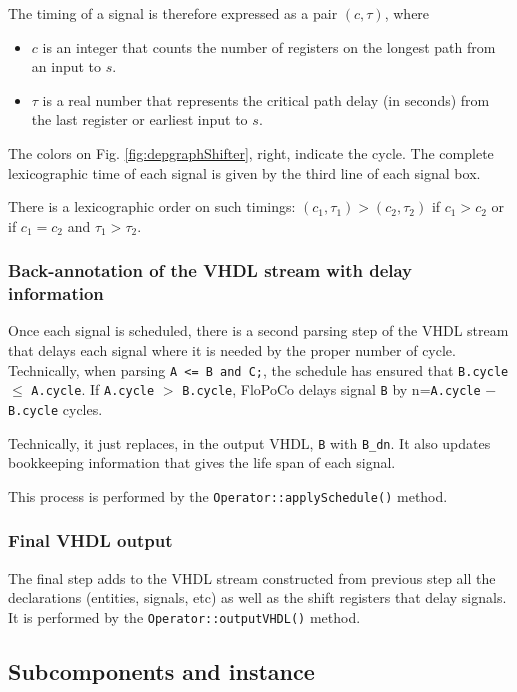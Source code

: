 \documentclass{article}
\begin{document}
The timing of a signal is therefore expressed as a pair $(c, \tau)$, where
\begin{itemize}
\item $c$ is an integer that counts the number of registers
  on the longest path from an input to $s$.
\item $\tau$ is a real number that represents the critical path delay (in seconds)
  from the last register or earliest input to $s$.
\end{itemize}

The colors on Fig. \ref{fig:depgraphShifter}, right,  indicate the cycle.
The complete lexicographic time of each signal is given by the third line of each signal box. 

There is a lexicographic order on such timings: $(c_1, \tau_1) > (c_2, \tau_2)$ if $c_1 > c_2$ or if $c_1 = c_2$ and $\tau_1 > \tau_2$.

\subsubsection{Back-annotation of the VHDL stream with delay information}
Once each signal is scheduled, there is a second parsing step of the VHDL stream that delays each signal where it is needed by the proper number of cycle.
Technically, when parsing
\verb!A <= B and C;!, the schedule has ensured that  \verb!B.cycle!$\le$ \verb!A.cycle!.
If \verb!A.cycle! $>$ \verb!B.cycle!, FloPoCo delays
signal \verb!B! by n=\verb!A.cycle! $-$ \verb!B.cycle! cycles.

Technically, it just replaces, in the output VHDL,   \verb!B! with \verb!B_dn!.
It also updates bookkeeping information that gives the life span of each signal.

This process is performed by the \verb!Operator::applySchedule()! method.

\subsubsection{Final VHDL output}
The final step adds to the VHDL stream constructed from previous step all the declarations (entities, signals, etc) as well as the shift registers that delay signals.
It is performed by the \verb!Operator::outputVHDL()! method.

\subsection{Subcomponents and instance}
\end{document}
